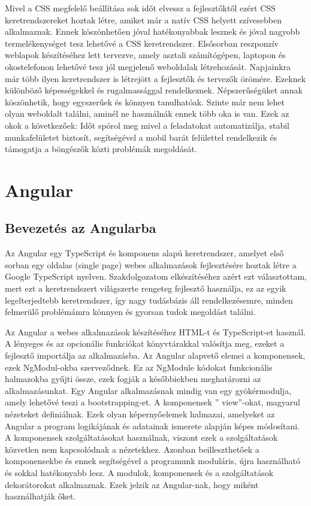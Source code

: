 \cite{4} Mivel a CSS megfelelő beállítása sok időt elvessz a fejlesztőktől ezért CSS keretrendszereket hoztak létre, amiket már a natív CSS helyett szívesebben alkalmaznak. Ennek köszönhetően jóval hatékonyabbak lesznek és jóval nagyobb termelékenységet tesz lehetővé a CSS keretrendszer. Elsősorban reszponzív weblapok készítéséhez lett tervezve, amely asztali számítógépen, laptopon és okostelefonon lehetővé tesz jól megjelenő weboldalak létrehozását. Napjainkra már több ilyen keretrendszer is létrejött a fejlesztők és tervezők örömére. Ezeknek különböző képességekkel és rugalmassággal rendelkeznek. Népszerűségüket annak köszönhetik, hogy egyszerűek és könnyen tanulhatóak. Szinte már nem lehet olyan weboldalt találni, aminél ne használnák ennek több oka is van. Ezek az okok a következőek: Időt spórol meg mivel a feladatokat automatizálja, stabil munkafelületet biztosít, segítségével a mobil barát felülettel rendelkezik és támogatja a böngészők közti problémák megoldását.

\section{Angular}
\subsection{Bevezetés az Angularba}
Az Angular \cite{5} egy TypeScript és komponens alapú keretrendszer, amelyet első sorban egy oldalas (single page) webes alkalmazások fejlesztésére hoztak létre a Google TypeScript nyelven. Szakdolgozatom elkészítéséhez azért ezt választottam, mert ezt a keretrendszert világszerte rengeteg fejlesztő használja, ez az egyik legelterjedtebb keretrendszer, így nagy tudásbázis áll rendelkezésemre, minden felmerülő problémámra könnyen és gyorsan tudok megoldást találni.

Az Angular a webes alkalmazások készítéséhez HTML-t és TypeScript-et használ. A lényeges és az opcionális funkciókat könyvtárakkal valósítja meg, ezeket a fejlesztő importálja az alkalmazásba. Az Angular alapvető elemei a komponensek, ezek NgModul-okba szerveződnek. Ez az NgModule kódokat funkcionális halmazokba gyűjti össze, ezek fogják a későbbiekben meghatározni az alkalmazásunkat. Egy Angular alkalmazásnak mindig van egy gyökérmodulja, amely lehetővé teszi a bootstrapping-et. A komponensek ” view”-okat, magyarul nézeteket definiálnak. Ezek olyan képernyőelemek halmazai, amelyeket az Angular a program logikájának és adatainak ismerete alapján képes módosítani. A komponensek szolgáltatásokat használnak, viszont ezek a szolgáltatások közvetlen nem kapcsolódnak a nézetekhez. Azonban beilleszthetőek a komponensekbe és ennek segítségével a programunk moduláris, újra használható és sokkal hatékonyabb lesz. A modulok, komponensek és a szolgáltatások dekorátorokat alkalmaznak. Ezek jelzik az Angular-nak, hogy miként használhatják őket.

